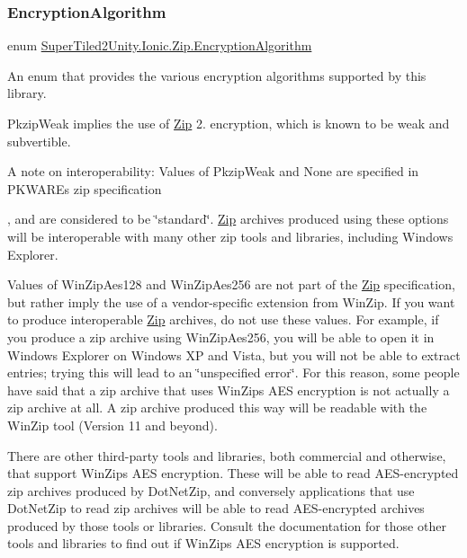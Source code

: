 \subsubsection{\texorpdfstring{Encryption\+Algorithm}{EncryptionAlgorithm}}
{\footnotesize\ttfamily enum \mbox{\hyperlink{namespace_super_tiled2_unity_1_1_ionic_1_1_zip_aa3f4e8aa12ef827ac72177a49b4e28e6}{Super\+Tiled2\+Unity.\+Ionic.\+Zip.\+Encryption\+Algorithm}}\hspace{0.3cm}{\ttfamily [strong]}}



An enum that provides the various encryption algorithms supported by this library. 

{\ttfamily Pkzip\+Weak} implies the use of \mbox{\hyperlink{namespace_super_tiled2_unity_1_1_ionic_1_1_zip}{Zip}} 2. encryption, which is known to be weak and subvertible. 

A note on interoperability\+: Values of {\ttfamily Pkzip\+Weak} and {\ttfamily None} are specified in P\+K\+W\+A\+RE\textquotesingle{}s zip specification

, and are considered to be \char`\"{}standard\char`\"{}. \mbox{\hyperlink{namespace_super_tiled2_unity_1_1_ionic_1_1_zip}{Zip}} archives produced using these options will be interoperable with many other zip tools and libraries, including Windows Explorer. 

Values of {\ttfamily Win\+Zip\+Aes128} and {\ttfamily Win\+Zip\+Aes256} are not part of the \mbox{\hyperlink{namespace_super_tiled2_unity_1_1_ionic_1_1_zip}{Zip}} specification, but rather imply the use of a vendor-\/specific extension from Win\+Zip. If you want to produce interoperable \mbox{\hyperlink{namespace_super_tiled2_unity_1_1_ionic_1_1_zip}{Zip}} archives, do not use these values. For example, if you produce a zip archive using Win\+Zip\+Aes256, you will be able to open it in Windows Explorer on Windows XP and Vista, but you will not be able to extract entries; trying this will lead to an \char`\"{}unspecified
  error\char`\"{}. For this reason, some people have said that a zip archive that uses Win\+Zip\textquotesingle{}s A\+ES encryption is not actually a zip archive at all. A zip archive produced this way will be readable with the Win\+Zip tool (Version 11 and beyond). 

There are other third-\/party tools and libraries, both commercial and otherwise, that support Win\+Zip\textquotesingle{}s A\+ES encryption. These will be able to read A\+E\+S-\/encrypted zip archives produced by Dot\+Net\+Zip, and conversely applications that use Dot\+Net\+Zip to read zip archives will be able to read A\+E\+S-\/encrypted archives produced by those tools or libraries. Consult the documentation for those other tools and libraries to find out if Win\+Zip\textquotesingle{}s A\+ES encryption is supported. 

